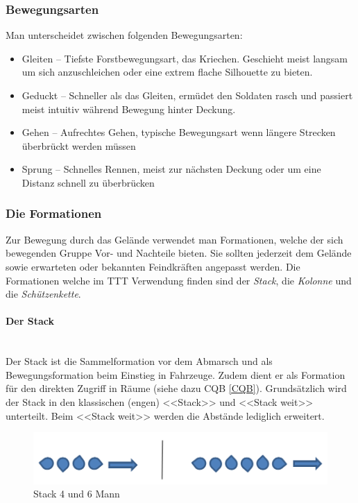 \subsubsection{Bewegungsarten}
Man unterscheidet zwischen folgenden Bewegungsarten:
\begin{itemize}
	\item Gleiten -- Tiefste Forstbewegungsart, das Kriechen. Geschieht meist langsam um sich anzuschleichen oder eine extrem flache Silhouette zu bieten.
	\item Geduckt -- Schneller als das Gleiten, ermüdet den Soldaten rasch und passiert meist intuitiv während Bewegung hinter Deckung.
	\item Gehen -- Aufrechtes Gehen, typische Bewegungsart wenn längere Strecken überbrückt werden müssen
	\item Sprung -- Schnelles Rennen, meist zur nächsten Deckung oder um eine Distanz schnell zu überbrücken
\end{itemize}
\subsubsection{Die Formationen}
Zur Bewegung durch das Gelände verwendet man Formationen, welche der sich bewegenden Gruppe Vor- und Nachteile bieten. Sie sollten jederzeit dem Gelände sowie erwarteten oder bekannten Feindkräften angepasst werden. Die Formationen welche im TTT Verwendung finden sind der \textit{Stack}, die \textit{Kolonne} und die \textit{Schützenkette}. 
\paragraph{Der Stack}$\ $\\
Der Stack ist die Sammelformation vor dem Abmarsch und als Bewegungsformation beim Einstieg in Fahrzeuge. Zudem dient er als Formation für den direkten Zugriff in Räume (siehe dazu CQB \autoref{CQB}). Grundsätzlich wird der Stack in den klassischen (engen) <<Stack>> und <<Stack weit>> unterteilt. Beim <<Stack weit>> werden die Abstände lediglich erweitert.\\
\begin{figure}[!htb]
	\centering
	\includegraphics[width=15cm]{./Grafiken/Abschnitt/Stack.png}
	\caption{Stack 4 und 6 Mann}
\end{figure}
